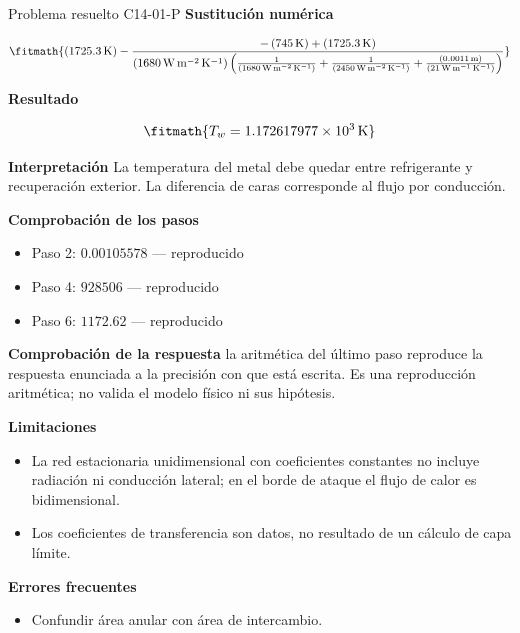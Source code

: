 \documentclass[10pt,openany]{book}
\begin{document}
\begin{studiumworked}{Problema resuelto C14-01-P}
\noindent\textbf{Sustitución numérica}

\[
\fitmath{\left(1725.3\,\mathrm{K}\right) - \frac{- \left(745\,\mathrm{K}\right) + \left(1725.3\,\mathrm{K}\right)}{\left(1680\,\mathrm{W}\,\mathrm{m}^{-2}\,\mathrm{K}^{-1}\right) \left(\frac{1}{\left(1680\,\mathrm{W}\,\mathrm{m}^{-2}\,\mathrm{K}^{-1}\right)} + \frac{1}{\left(2450\,\mathrm{W}\,\mathrm{m}^{-2}\,\mathrm{K}^{-1}\right)} + \frac{\left(0.0011\,\mathrm{m}\right)}{\left(21\,\mathrm{W}\,\mathrm{m}^{-1}\,\mathrm{K}^{-1}\right)}\right)}}
\]

\noindent\textbf{Resultado}

\[
\fitmath{T_w=1.172617977\times10^{3}\,\mathrm{K}}
\]

\noindent\textbf{Interpretación}
La temperatura del metal debe quedar entre refrigerante y recuperación exterior. La diferencia de caras corresponde al flujo por conducción.

\noindent\textbf{Comprobación de los pasos}
\begin{itemize}
\item Paso 2: $0.00105578$ — reproducido
\item Paso 4: $928506$ — reproducido
\item Paso 6: $1172.62$ — reproducido
\end{itemize}

\noindent\textbf{Comprobación de la respuesta} la aritmética del último paso reproduce la respuesta enunciada a la precisión con que está escrita. Es una reproducción aritmética; no valida el modelo físico ni sus hipótesis.

\noindent\textbf{Limitaciones}
\begin{itemize}
\item La red estacionaria unidimensional con coeficientes constantes no incluye radiación ni conducción lateral; en el borde de ataque el flujo de calor es bidimensional.
\item Los coeficientes de transferencia son datos, no resultado de un cálculo de capa límite.
\end{itemize}

\noindent\textbf{Errores frecuentes}
\begin{itemize}
\item Confundir área anular con área de intercambio.
\end{itemize}
\end{studiumworked}
\end{document}
